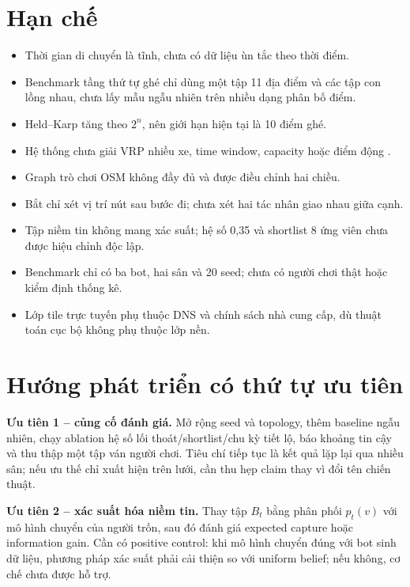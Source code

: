 \section{Hạn chế}

\begin{itemize}
  \item Thời gian di chuyển là tĩnh, chưa có dữ liệu ùn tắc theo thời điểm.
  \item Benchmark tầng thứ tự ghé chỉ dùng một tập 11 địa điểm và các tập con lồng
  nhau, chưa lấy mẫu ngẫu nhiên trên nhiều dạng phân bố điểm.
  \item Held--Karp tăng theo $2^n$, nên giới hạn hiện tại là 10 điểm ghé.
  \item Hệ thống chưa giải VRP nhiều xe, time window, capacity hoặc điểm động
  \cite{toth2014}.
  \item Graph trò chơi OSM không đầy đủ và được điều chỉnh hai chiều.
  \item Bắt chỉ xét vị trí nút sau bước đi; chưa xét hai tác nhân giao nhau giữa cạnh.
  \item Tập niềm tin không mang xác suất; hệ số 0,35 và shortlist 8 ứng viên chưa
  được hiệu chỉnh độc lập.
  \item Benchmark chỉ có ba bot, hai sân và 20 seed; chưa có người chơi thật hoặc
  kiểm định thống kê.
  \item Lớp tile trực tuyến phụ thuộc DNS và chính sách nhà cung cấp, dù thuật
  toán cục bộ không phụ thuộc lớp nền.
\end{itemize}

\section{Hướng phát triển có thứ tự ưu tiên}

\textbf{Ưu tiên 1 -- củng cố đánh giá.} Mở rộng seed và topology, thêm baseline
ngẫu nhiên, chạy ablation hệ số lối thoát/shortlist/chu kỳ tiết lộ, báo khoảng tin
cậy và thu thập một tập ván người chơi. Tiêu chí tiếp tục là kết quả lặp lại qua
nhiều sân; nếu ưu thế chỉ xuất hiện trên lưới, cần thu hẹp claim thay vì đổi tên
chiến thuật.

\textbf{Ưu tiên 2 -- xác suất hóa niềm tin.} Thay tập $B_t$ bằng phân phối
$p_t(v)$ với mô hình chuyển của người trốn, sau đó đánh giá expected capture hoặc
information gain. Cần có positive control: khi mô hình chuyển đúng với bot sinh
dữ liệu, phương pháp xác suất phải cải thiện so với uniform belief; nếu không,
cơ chế chưa được hỗ trợ.

